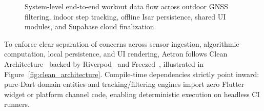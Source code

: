 \begin{figure}[htbp]
{%
}
\caption{System-level end-to-end workout data flow across outdoor GNSS filtering, indoor step tracking, offline Isar persistence, shared UI modules, and Supabase cloud finalization.}
\label{fig:system_dataflow}
\end{figure}

To enforce clear separation of concerns across sensor ingestion, algorithmic computation, local persistence, and UI rendering, Aetron follows Clean Architecture~\cite{martin2017clean} backed by Riverpod~\cite{riverpod2024state} and Freezed~\cite{freezed2024}, illustrated in Figure~\ref{fig:clean_architecture}. Compile-time dependencies strictly point inward: pure-Dart domain entities and tracking/filtering engines import zero Flutter widget or platform channel code, enabling deterministic execution on headless CI runners.

